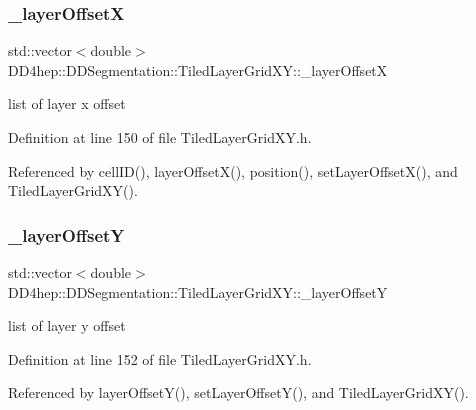 \subsubsection{\texorpdfstring{\+\_\+layer\+OffsetX}{\_layerOffsetX}}
{\footnotesize\ttfamily std\+::vector$<$double$>$ D\+D4hep\+::\+D\+D\+Segmentation\+::\+Tiled\+Layer\+Grid\+X\+Y\+::\+\_\+layer\+OffsetX\hspace{0.3cm}{\ttfamily [protected]}}



list of layer x offset 



Definition at line 150 of file Tiled\+Layer\+Grid\+X\+Y.\+h.



Referenced by cell\+I\+D(), layer\+Offset\+X(), position(), set\+Layer\+Offset\+X(), and Tiled\+Layer\+Grid\+X\+Y().

\hypertarget{class_d_d4hep_1_1_d_d_segmentation_1_1_tiled_layer_grid_x_y_a0ee4e15bd3807f5ecccc82ffb7962377}{}\label{class_d_d4hep_1_1_d_d_segmentation_1_1_tiled_layer_grid_x_y_a0ee4e15bd3807f5ecccc82ffb7962377} 
\subsubsection{\texorpdfstring{\+\_\+layer\+OffsetY}{\_layerOffsetY}}
{\footnotesize\ttfamily std\+::vector$<$double$>$ D\+D4hep\+::\+D\+D\+Segmentation\+::\+Tiled\+Layer\+Grid\+X\+Y\+::\+\_\+layer\+OffsetY\hspace{0.3cm}{\ttfamily [protected]}}



list of layer y offset 



Definition at line 152 of file Tiled\+Layer\+Grid\+X\+Y.\+h.



Referenced by layer\+Offset\+Y(), set\+Layer\+Offset\+Y(), and Tiled\+Layer\+Grid\+X\+Y().

\hypertarget{class_d_d4hep_1_1_d_d_segmentation_1_1_tiled_layer_grid_x_y_aa5658d900b004184ff4bd2160438bbeb}{}\label{class_d_d4hep_1_1_d_d_segmentation_1_1_tiled_layer_grid_x_y_aa5658d900b004184ff4bd2160438bbeb} 
